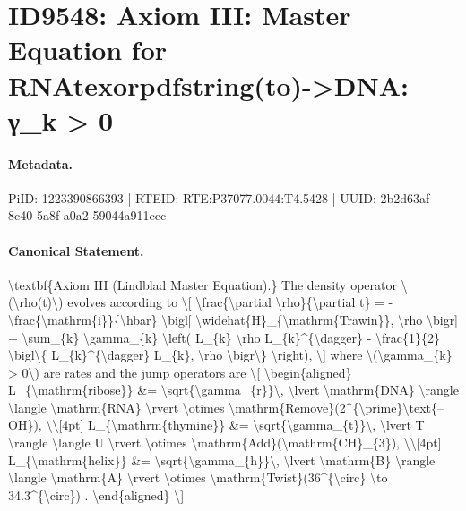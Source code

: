 \section*{ID9548: Axiom III: Master Equation for RNAtexorpdfstring(to)->DNA: γ\_k > 0}
\paragraph{Metadata.}
PiID: 1223390866393 | RTEID: RTE:P37077.0044:T4.5428 | UUID: 2b2d63af-8c40-5a8f-a0a2-59044a911ccc

\paragraph{Canonical Statement.}
\textbackslash{}textbf\{Axiom III (Lindblad Master Equation).\} The density operator \textbackslash{}(\textbackslash{}rho(t)\textbackslash{}) evolves according to \textbackslash{}[ \textbackslash{}frac\{\textbackslash{}partial \textbackslash{}rho\}\{\textbackslash{}partial t\} = - \textbackslash{}frac\{\textbackslash{}mathrm\{i\}\}\{\textbackslash{}hbar\} \textbackslash{}bigl[ \textbackslash{}widehat\{H\}\_\{\textbackslash{}mathrm\{Trawin\}\}, \textbackslash{}rho \textbackslash{}bigr] + \textbackslash{}sum\_\{k\} \textbackslash{}gamma\_\{k\} \textbackslash{}left( L\_\{k\} \textbackslash{}rho L\_\{k\}\textasciicircum{}\{\textbackslash{}dagger\} - \textbackslash{}frac\{1\}\{2\} \textbackslash{}bigl\textbackslash{}\{ L\_\{k\}\textasciicircum{}\{\textbackslash{}dagger\} L\_\{k\}, \textbackslash{}rho \textbackslash{}bigr\textbackslash{}\} \textbackslash{}right), \textbackslash{}] where \textbackslash{}(\textbackslash{}gamma\_\{k\} > 0\textbackslash{}) are rates and the jump operators are \textbackslash{}[ \textbackslash{}begin\{aligned\} L\_\{\textbackslash{}mathrm\{ribose\}\} \&= \textbackslash{}sqrt\{\textbackslash{}gamma\_\{r\}\}\textbackslash{}, \textbackslash{}lvert \textbackslash{}mathrm\{DNA\} \textbackslash{}rangle \textbackslash{}langle \textbackslash{}mathrm\{RNA\} \textbackslash{}rvert \textbackslash{}otimes \textbackslash{}mathrm\{Remove\}(2\textasciicircum{}\{\textbackslash{}prime\}\textbackslash{}text\{--OH\}), \textbackslash{}\textbackslash{}[4pt] L\_\{\textbackslash{}mathrm\{thymine\}\} \&= \textbackslash{}sqrt\{\textbackslash{}gamma\_\{t\}\}\textbackslash{}, \textbackslash{}lvert T \textbackslash{}rangle \textbackslash{}langle U \textbackslash{}rvert \textbackslash{}otimes \textbackslash{}mathrm\{Add\}(\textbackslash{}mathrm\{CH\}\_\{3\}), \textbackslash{}\textbackslash{}[4pt] L\_\{\textbackslash{}mathrm\{helix\}\} \&= \textbackslash{}sqrt\{\textbackslash{}gamma\_\{h\}\}\textbackslash{}, \textbackslash{}lvert \textbackslash{}mathrm\{B\} \textbackslash{}rangle \textbackslash{}langle \textbackslash{}mathrm\{A\} \textbackslash{}rvert \textbackslash{}otimes \textbackslash{}mathrm\{Twist\}(36\textasciicircum{}\{\textbackslash{}circ\} \textbackslash{}to 34.3\textasciicircum{}\{\textbackslash{}circ\}) . \textbackslash{}end\{aligned\} \textbackslash{}]

